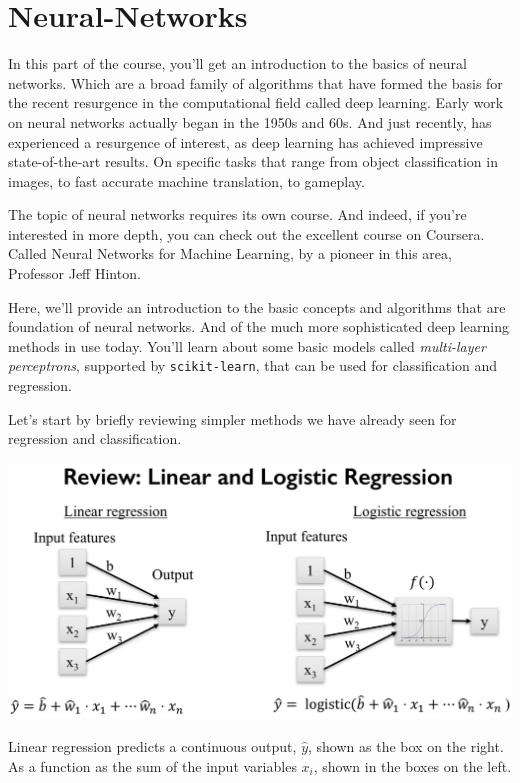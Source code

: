 \section{Neural-Networks}
\begin{multicols}{2}

In this part of the course, you'll get an introduction to the basics of neural networks. Which are a broad family of algorithms that have formed the basis for the recent resurgence in the computational field called deep learning. Early work on neural networks actually began in the 1950s and 60s. And just recently, has experienced a resurgence of interest, as deep learning has achieved impressive state-of-the-art results. On specific tasks that range from object classification in images, to fast accurate machine translation, to gameplay. 

The topic of neural networks requires its own course. And indeed, if you're interested in more depth, you can check out the excellent course on Coursera. Called Neural Networks for Machine Learning, by a pioneer in this area, Professor Jeff Hinton. 

Here, we'll provide an introduction to the basic concepts and algorithms that are foundation of neural networks. And of the much more sophisticated deep learning methods in use today. You'll learn about some basic models called \emph{multi-layer perceptrons}, supported by \texttt{scikit-learn}, that can be used for classification and regression. 

Let's start by briefly reviewing simpler methods we have already seen for regression and classification. 

\begin{center}
	\includegraphics[width=\linewidth]{img/Linear-Regression-Logistic-Regression.png} 
\end{center} 

Linear regression predicts a continuous output, $\hat{y}$, shown as the box on the right. As a function as the sum of the input variables $x_i$, shown in the boxes on the left. 


\end{multicols}
